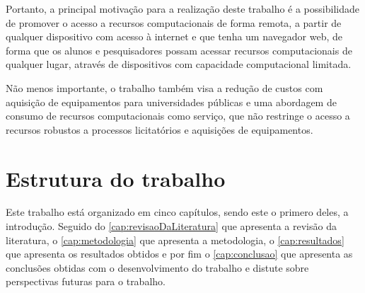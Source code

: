 Portanto, a principal motivação para a realização deste trabalho é a possibilidade de promover o
acesso a recursos computacionais de forma remota, a partir de qualquer dispositivo com acesso à
internet e que tenha um navegador web, de forma que os alunos e pesquisadores possam acessar
recursos computacionais de qualquer lugar, através de dispositivos com capacidade computacional
limitada.

Não menos importante, o trabalho também visa a redução de custos com aquisição de equipamentos para universidades públicas e uma abordagem de consumo de recursos computacionais como serviço, que não restringe o acesso a recursos robustos a processos licitatórios e aquisições de equipamentos.


\section{Estrutura do trabalho}
\label{sec:estruturaTrabalho}

Este trabalho está organizado em cinco capítulos, sendo este o primero deles, a introdução. Seguido do \autoref{cap:revisaoDaLiteratura} que apresenta a revisão da literatura, o \autoref{cap:metodologia} que apresenta a metodologia, o \autoref{cap:resultados} que apresenta os resultados obtidos e por fim o \autoref{cap:conclusao} que apresenta as conclusões obtidas com o desenvolvimento do trabalho e distute sobre perspectivas futuras para o trabalho.

